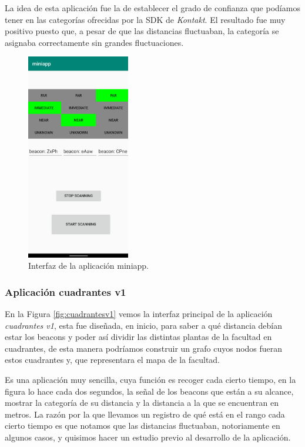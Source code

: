 La idea de esta aplicación fue la de establecer el grado de confianza que podíamos tener en las categorías ofrecidas por la SDK de \textit{Kontakt}. El resultado fue muy positivo puesto que, a pesar de que las distancias fluctuaban, la categoría se asignaba correctamente sin grandes fluctuaciones. 

\begin{figure}[t]
	\centering
	\includegraphics[width=0.4\textwidth]{Imagenes/Descripciondeltrabajo/miniapp}
	\caption{Interfaz de la aplicación miniapp. }
	\label{fig:miniapp}
\end{figure}

\subsubsection{Aplicación cuadrantes v1}
En la Figura \ref{fig:cuadrantesv1} vemos la interfaz principal de la aplicación \textit{cuadrantes v1}, esta fue diseñada, en inicio, para saber a qué distancia debían estar los beacons y poder así dividir las distintas plantas de la facultad en cuadrantes, de esta manera podríamos construir un grafo cuyos nodos fueran estos cuadrantes y, que representara el mapa de la facultad.

Es una aplicación muy sencilla, cuya función es recoger cada cierto tiempo, en la figura lo hace cada dos segundos, la señal de los beacons que están a su alcance, mostrar la categoría de su distancia y la distancia a la que se encuentran en metros. La razón por la que llevamos un registro de qué está en el rango cada cierto tiempo es que notamos que las distancias fluctuaban, notoriamente en algunos casos, y quisimos hacer un estudio previo al desarrollo de la aplicación.

